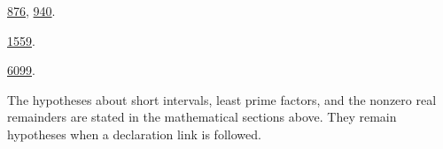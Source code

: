 \begin{description}[leftmargin=1.2em,style=nextline]
\item[\texttt{FactorialZeroPlateau.lean}] \href{https://github.com/wcook04/plectis-erdos/blob/99f4bf47422abbd8757cbb22b50ba079d764d3a7/ErdosProblems/Erdos68/FactorialZeroPlateau.lean#L876}{876}, \href{https://github.com/wcook04/plectis-erdos/blob/99f4bf47422abbd8757cbb22b50ba079d764d3a7/ErdosProblems/Erdos68/FactorialZeroPlateau.lean#L940}{940}.
\item[\texttt{PrimeUnitTranslator.lean}] \href{https://github.com/wcook04/plectis-erdos/blob/99f4bf47422abbd8757cbb22b50ba079d764d3a7/ErdosProblems/Erdos68/PrimeUnitTranslator.lean#L1559}{1559}.
\item[\texttt{PrimeZeroBranch.lean}] \href{https://github.com/wcook04/plectis-erdos/blob/99f4bf47422abbd8757cbb22b50ba079d764d3a7/ErdosProblems/Erdos68/PrimeZeroBranch.lean#L6099}{6099}.
\end{description}
\endgroup

The hypotheses about short intervals, least prime factors, and the
nonzero real remainders are stated in the mathematical sections above.
They remain hypotheses when a declaration link is followed.




